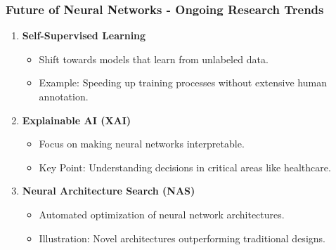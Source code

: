 \documentclass[aspectratio=169]{beamer}
\begin{document}
\begin{frame}[fragile]
    \frametitle{Future of Neural Networks - Ongoing Research Trends}
    \begin{enumerate}
        \item \textbf{Self-Supervised Learning}
            \begin{itemize}
                \item Shift towards models that learn from unlabeled data.
                \item Example: Speeding up training processes without extensive human annotation.
            \end{itemize}
            
        \item \textbf{Explainable AI (XAI)}
            \begin{itemize}
                \item Focus on making neural networks interpretable.
                \item Key Point: Understanding decisions in critical areas like healthcare.
            \end{itemize}
            
        \item \textbf{Neural Architecture Search (NAS)}
            \begin{itemize}
                \item Automated optimization of neural network architectures.
                \item Illustration: Novel architectures outperforming traditional designs.
            \end{itemize}
    \end{enumerate}
\end{frame}
\end{document}
